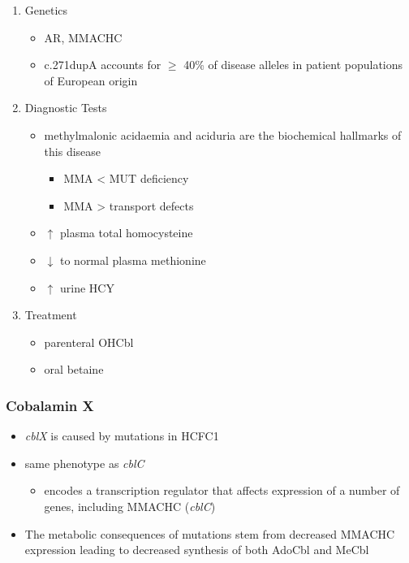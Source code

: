 \documentclass{scrartcl}
\begin{document}
\begin{enumerate}
\item Genetics
\label{sec:org03b8186}
\begin{itemize}
\item AR, MMACHC
\item c.271dupA accounts for \(\ge\) 40\% of disease alleles in patient
populations of European origin
\end{itemize}

\item Diagnostic Tests
\label{sec:orgdc9562a}
\begin{itemize}
\item methylmalonic acidaemia and aciduria are the
biochemical hallmarks of this disease
\begin{itemize}
\item MMA \textless{} MUT deficiency
\item MMA \textgreater{} transport defects
\end{itemize}
\item \(\uparrow\) plasma total homocysteine
\item \(\downarrow\) to normal plasma methionine
\item \(\uparrow\) urine HCY
\end{itemize}

\item Treatment
\label{sec:orgfff1d54}
\begin{itemize}
\item parenteral OHCbl
\item oral betaine
\end{itemize}
\end{enumerate}

\subsubsection{Cobalamin X}
\label{sec:org9c881df}
\begin{itemize}
\item \emph{cblX} is caused by mutations in HCFC1
\item same phenotype as \emph{cblC}
\begin{itemize}
\item encodes a transcription regulator that affects expression of a
number of genes, including MMACHC (\emph{cblC})
\end{itemize}
\item The metabolic consequences of mutations stem from decreased MMACHC
expression leading to decreased synthesis of both AdoCbl and MeCbl
\end{itemize}
\end{document}
